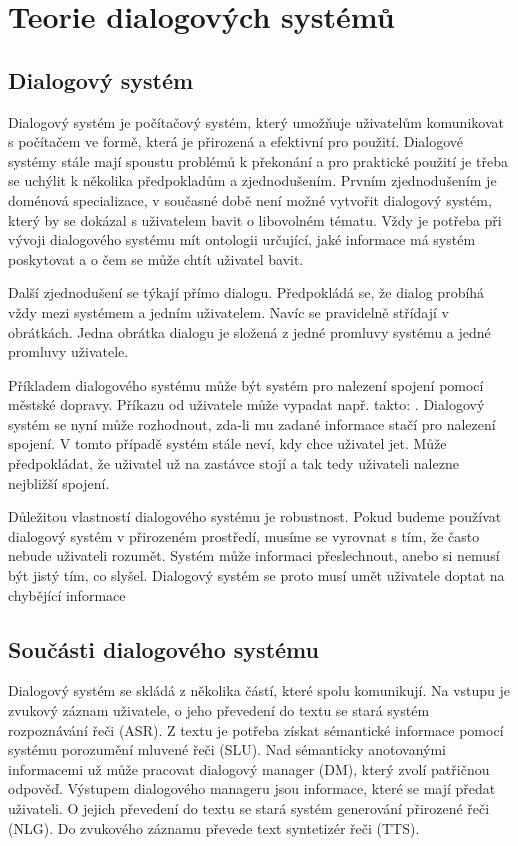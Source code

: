 \chapter{Teorie dialogových systémů}

\section{Dialogový systém}

Dialogový systém je počítačový systém, který umožňuje uživatelům komunikovat s počítačem ve formě, která je přirozená a efektivní pro použití.
Dialogové systémy stále mají spoustu problémů k překonání a pro praktické použití je třeba se uchýlit k několika předpokladům a zjednodušením.
Prvním zjednodušením je doménová specializace, v současné době není možné vytvořit dialogový systém, který by se dokázal s uživatelem bavit o libovolném tématu.
Vždy je potřeba při vývoji dialogového systému mít ontologii určující, jaké informace má systém poskytovat a o čem se může chtít uživatel bavit.

Další zjednodušení se týkají přímo dialogu.
Předpokládá se, že dialog probíhá vždy mezi systémem a jedním uživatelem.
Navíc se pravidelně střídají v obrátkách.
Jedna obrátka dialogu je složená z jedné promluvy systému a jedné promluvy uživatele.

Příkladem dialogového systému může být systém pro nalezení spojení pomocí
městské dopravy. Příkazu od uživatele může vypadat např. takto: . Dialogový systém se nyní může rozhodnout,
zda-li mu zadané informace stačí pro nalezení spojení. V tomto případě systém
stále neví, kdy chce uživatel jet. Může předpokládat, že uživatel už na
zastávce stojí a tak tedy uživateli nalezne nejbližší spojení.

Důležitou vlastností dialogového systému je robustnost. Pokud budeme používat
dialogový systém v přirozeném prostředí, musíme se vyrovnat s tím, že často
nebude uživateli rozumět.
Systém může informaci přeslechnout, anebo si nemusí být jistý tím, co slyšel.
Dialogový systém se proto musí umět uživatele doptat na chybějící informace


\section{Součásti dialogového systému}

Dialogový systém se skládá z několika částí, které spolu komunikují.
Na vstupu je zvukový záznam uživatele, o jeho převedení do textu se stará systém rozpoznávání řeči (ASR).
Z textu je potřeba získat sémantické informace pomocí systému porozumění mluvené řeči (SLU).
Nad sémanticky anotovanými informacemi už může pracovat dialogový manager (DM), který zvolí patřičnou odpověď.
Výstupem dialogového manageru jsou informace, které se mají předat uživateli.
O jejich převedení do textu se stará systém generování přirozené řeči (NLG).
Do zvukového záznamu převede text syntetizér řeči (TTS).

